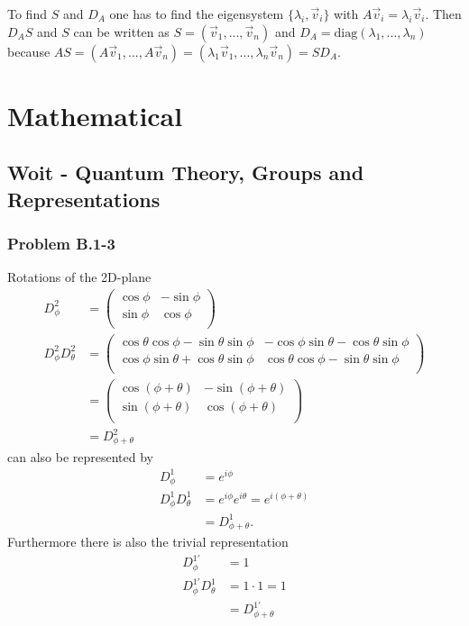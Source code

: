 \documentclass[10pt,a4paper]{article}
\theoremstyle{definition}
\begin{document}
To find $S$ and $D_A$ one has to find the eigensystem $\{\lambda_i,\vec{v}_i\}$ with $A\vec{v}_i=\lambda_i\vec{v}_i$. Then $D_AS$ and $S$ can be written as $S=(\vec{v}_1,...,\vec{v}_n)$ and $D_A=\text{diag}(\lambda_1,...,\lambda_n)$ because $AS=(A\vec{v}_1,...,A\vec{v}_n)=(\lambda_1\vec{v}_1,...,\lambda_n\vec{v}_n)=SD_A$.


\newpage
\section{Mathematical}
\subsection{{\sc Woit} - Quantum Theory, Groups and Representations}

\subsubsection{Problem B.1-3}
Rotations of the 2D-plane
\begin{align}
D^2_\phi&=\left(
\begin{array}{cc}
\cos\phi& -\sin\phi  \\
\sin\phi & \cos\phi  \\
\end{array}
\right)\\
D^2_\phi D^2_\theta&= \left(
\begin{array}{cc}
 \cos\theta \cos\phi-\sin\theta \sin\phi  & -\cos\phi \sin\theta-\cos\theta\sin\phi \\
 \cos\phi\sin\theta+\cos\theta \sin\phi & \cos\theta \cos\phi
   -\sin\theta \sin\phi \\
\end{array}
\right)\\
&=\left(
\begin{array}{cc}
\cos(\phi+\theta)& -\sin(\phi+\theta)  \\
\sin(\phi+\theta) & \cos(\phi+\theta)  \\
\end{array}
\right)\\
&=D^2_{\phi+\theta}
\end{align}
can also be represented by
\begin{align}
D^1_\phi&=e^{i\phi}\\
D^1_\phi D^1_\theta&=e^{i\phi}e^{i\theta}=e^{i(\phi+\theta)}\\
&=D^1_{\phi+\theta}.
\end{align}
Furthermore there is also the trivial representation
\begin{align}
D^{1'}_\phi&=1\\
D^{1'}_\phi D^1_\theta&=1\cdot1=1\\
&=D^{1'}_{\phi+\theta}
\end{align}
\end{document}
